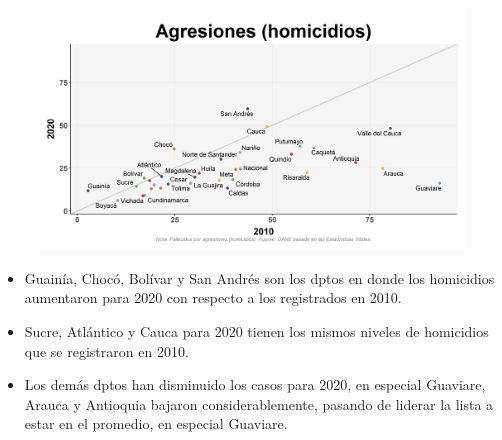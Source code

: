     \begin{figure}[H]
        \caption[Agresiones (homicidios) por departamentos - 2010 VS 2020 ]{\label{homicid_dpto_scatter} }
        \begin{center}
        \includegraphics[width=\textwidth,keepaspectratio]{img/var_286_scatter_time.png}
        \end{center}
    \end{figure}
            \begin{itemize}
                \item Guainía, Chocó, Bolívar y San Andrés son los dptos en donde los homicidios aumentaron para 2020 con respecto a los registrados en 2010.
                \item Sucre, Atlántico y Cauca para 2020 tienen los mismos niveles de homicidios  que se registraron en 2010.
                \item Los demás dptos han disminuido los casos para 2020, en especial Guaviare, Arauca y Antioquia bajaron considerablemente, pasando de liderar la lista a estar en el promedio, en especial Guaviare. 
                \end{itemize}

